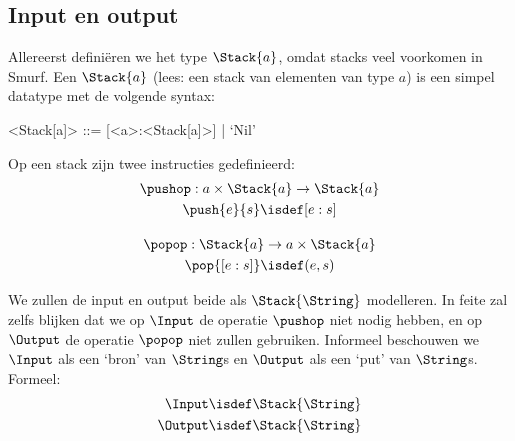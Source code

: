 \subsection{Input en output}
\label{sec:def:io}

Allereerst definiëren we het type $\Stack{a}$, omdat stacks veel voorkomen in
Smurf. Een $\Stack{a}$ (lees: een stack van elementen van type $a$) is een
simpel datatype met de volgende syntax:

\begin{grammar}
	<Stack[a]> ::= [<a>:<Stack[a]>] | `Nil'
\end{grammar}

Op een stack zijn twee instructies gedefinieerd:
\begin{gather*}
	\pushop : a \times \Stack{a} \to \Stack{a} \\
	\push{e}{s} \isdef [e:s] \\[1em]
	\popop : \Stack{a} \to a \times \Stack{a} \\
	\pop{[e:s]} \isdef (e,s) \\
\end{gather*}

\medskip
We zullen de input en output beide als $\Stack{\String}$ modelleren. In feite
zal zelfs blijken dat we op $\Input$ de operatie $\pushop$ niet nodig hebben,
en op $\Output$ de operatie $\popop$ niet zullen gebruiken. Informeel
beschouwen we $\Input$ als een `bron' van $\String$s en $\Output$ als een `put'
van $\String$s. Formeel:
\begin{align*}
	\Input &\isdef \Stack{\String} \\ \Output &\isdef \Stack{\String}
\end{align*}

